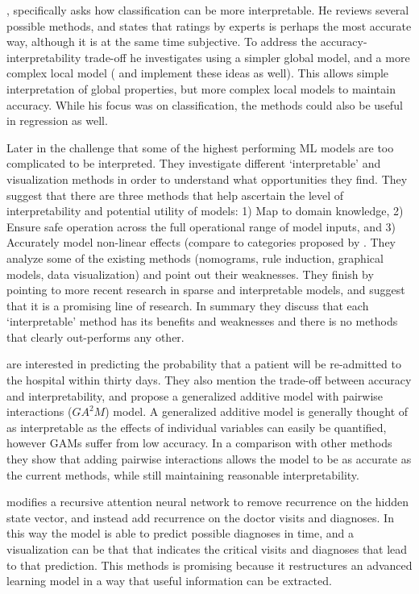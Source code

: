     \citet{Ruping2006-xj}, specifically asks how classification can be more interpretable. He reviews several possible methods, and states that ratings by experts is perhaps the most accurate way, although it is at the same time subjective. To address the accuracy-interpretability trade-off he investigates using a simpler global model, and a more complex local model (\citet{Otte2013-oo} and \citet{Ribeiro2016-uc} implement these ideas as well). This allows simple interpretation of global properties, but more complex local models to maintain accuracy. While his focus was on classification, the methods could also be useful in regression as well.

    Later in \citet{Van_Belle2013-ph} the challenge that some of the highest performing ML models are too complicated to be interpreted. They investigate different `interpretable' and visualization methods in order to understand what opportunities they find. They suggest that there are three methods that help ascertain the level of interpretability and potential utility of models: 1) Map to domain knowledge, 2) Ensure safe operation across the full operational range of model inputs, and 3) Accurately model non-linear effects (compare to categories proposed by \citet{Lipton2016-ug}. They analyze some of the existing methods (nomograms, rule induction, graphical models, data visualization) and point out their weaknesses. They finish by pointing to more recent research in sparse and interpretable models, and suggest that it is a promising line of research. In summary they discuss that each `interpretable' method has its benefits and weaknesses and there is no methods that clearly out-performs any other.

    \citet{Caruana2015-za} are interested in predicting the probability that a patient will be re-admitted to the hospital within thirty days. They also mention the trade-off between accuracy and interpretability, and propose a generalized additive model with pairwise interactions ($GA^2M$) model. A generalized additive model is generally thought of as interpretable as the effects of individual variables can easily be quantified, however GAMs suffer from low accuracy. In a comparison with other methods they show that adding pairwise interactions allows the model to be as accurate as the current methods, while still maintaining reasonable interpretability.

    \citet{Choi2016-by} modifies a recursive attention neural network to remove recurrence on the hidden state vector, and instead add recurrence on the doctor visits and diagnoses. In this way the model is able to predict possible diagnoses in time, and a visualization can be that that indicates the critical visits and diagnoses that lead to that prediction. This methods is promising because it restructures an advanced learning model in a way that useful information can be extracted.

